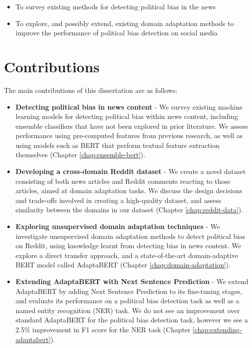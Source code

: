 \begin{itemize}
    \item To survey existing methods for detecting political bias in the news
    \item To explore, and possibly extend, existing domain adaptation methods to improve the performance of political bias detection on social media
\end{itemize}

\section{Contributions}

The main contributions of this dissertation are as follows:

\begin{itemize}
    \item \textbf{Detecting political bias in news content} - We survey existing machine learning models for detecting political bias within news content, including ensemble classifiers that have not been explored in prior literature. We assess performance using pre-computed features from previous research, as well as using models such as BERT that perform textual feature extraction themselves (Chapter \ref{chap:ensemble-bert}).
    \item \textbf{Developing a cross-domain Reddit dataset} - We create a novel dataset consisting of both news articles and Reddit comments reacting to those articles, aimed at domain adaptation tasks. We discuss the design decisions and trade-offs involved in creating a high-quality dataset, and assess similarity between the domains in our dataset (Chapter \ref{chap:reddit-data}).
    \item \textbf{Exploring unsupervised domain adaptation techniques} - We investigate unsupervised domain adaptation methods to detect political bias on Reddit, using knowledge learnt from detecting bias in news content. We explore a direct transfer approach, and a state-of-the-art domain-adaptive BERT model called AdaptaBERT (Chapter \ref{chap:domain-adaptation}).
    \item \textbf{Extending AdaptaBERT with Next Sentence Prediction} - We extend AdaptaBERT by adding Next Sentence Prediction to its fine-tuning stages, and evaluate its performance on a political bias detection task as well as a named entity recognition (NER) task. We do not see an improvement over standard AdaptaBERT for the political bias detection task, however we see a 2.5\% improvement in F1 score for the NER task (Chapter \ref{chap:extending-adaptabert}).
\end{itemize}
